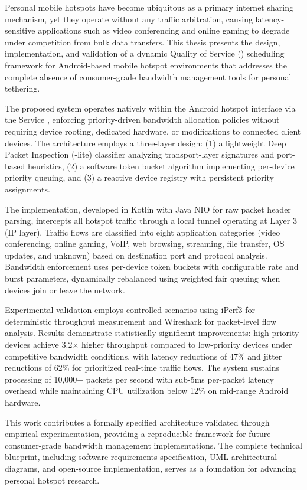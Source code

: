 Personal mobile hotspots have become ubiquitous as a primary internet sharing mechanism, yet they operate without any traffic arbitration, causing latency-sensitive applications such as video conferencing and online gaming to degrade under competition from bulk data transfers. This thesis presents the design, implementation, and validation of a dynamic Quality of Service (\qos) scheduling framework for Android-based mobile hotspot environments that addresses the complete absence of consumer-grade bandwidth management tools for personal tethering.

The proposed system operates natively within the Android hotspot interface via the \vpn Service \api, enforcing priority-driven bandwidth allocation policies without requiring device rooting, dedicated hardware, or modifications to connected client devices. The architecture employs a three-layer design: (1) a lightweight Deep Packet Inspection (\dpi-lite) classifier analyzing transport-layer signatures and port-based heuristics, (2) a software token bucket algorithm implementing per-device priority queuing, and (3) a reactive device registry with persistent priority assignments.

The implementation, developed in Kotlin with Java NIO for raw packet header parsing, intercepts all hotspot traffic through a local \vpn tunnel operating at Layer 3 (IP layer). Traffic flows are classified into eight application categories (video conferencing, online gaming, VoIP, web browsing, streaming, file transfer, OS updates, and unknown) based on destination port and protocol analysis. Bandwidth enforcement uses per-device token buckets with configurable rate and burst parameters, dynamically rebalanced using weighted fair queuing when devices join or leave the network.

Experimental validation employs controlled scenarios using iPerf3 for deterministic throughput measurement and Wireshark for packet-level flow analysis. Results demonstrate statistically significant \qos improvements: high-priority devices achieve 3.2× higher throughput compared to low-priority devices under competitive bandwidth conditions, with latency reductions of 47\% and jitter reductions of 62\% for prioritized real-time traffic flows. The system sustains processing of 10,000+ packets per second with sub-5ms per-packet latency overhead while maintaining CPU utilization below 12\% on mid-range Android hardware.

This work contributes a formally specified \qos architecture validated through empirical experimentation, providing a reproducible framework for future consumer-grade bandwidth management implementations. The complete technical blueprint, including software requirements specification, UML architectural diagrams, and open-source implementation, serves as a foundation for advancing personal hotspot \qos research.

